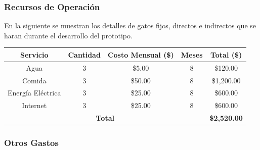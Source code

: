 \documentclass[12pt]{report}%
\begin{document}
\subsubsection{Recursos de Operación}
En la siguiente se muestran los detalles de gatos fijos, directos e indirectos que se haran durante el desarrollo del prototipo. 
\begin{table}[htbp]
\begin{tabular}{|c|c|c|c|c|}
\hline
\rowcolor[HTML]{9698ED} 
{\color[HTML]{000000} \textbf{Servicio}} & {\color[HTML]{000000} \textbf{Cantidad}} & {\color[HTML]{000000} \textbf{Costo Mensual (\$)}} & {\color[HTML]{000000} \textbf{Meses}} & {\color[HTML]{000000} \textbf{Total (\$)}} \\ \hline
{\color[HTML]{000000} Agua}              & {\color[HTML]{000000} 3}                 & {\color[HTML]{000000} \$5.00}                      & {\color[HTML]{000000} 8}              & {\color[HTML]{000000} \$120.00}            \\ \hline
{\color[HTML]{000000} Comida}            & {\color[HTML]{000000} 3}                 & {\color[HTML]{000000} \$50.00}                     & {\color[HTML]{000000} 8}              & {\color[HTML]{000000} \$1,200.00}          \\ \hline
{\color[HTML]{000000} Energía Eléctrica} & {\color[HTML]{000000} 3}                 & {\color[HTML]{000000} \$25.00}                     & {\color[HTML]{000000} 8}              & {\color[HTML]{000000} \$600.00}            \\ \hline
{\color[HTML]{000000} Internet}          & {\color[HTML]{000000} 3}                 & {\color[HTML]{000000} \$25.00}                     & {\color[HTML]{000000} 8}              & {\color[HTML]{000000} \$600.00}            \\ \hline
\multicolumn{4}{|c|}{{\color[HTML]{000000} \textbf{Total}}}                                                                                                                      & {\color[HTML]{000000} \textbf{\$2,520.00}} \\ \hline
\end{tabular}
\end{table}

\subsubsection{Otros Gastos}
\end{document}

